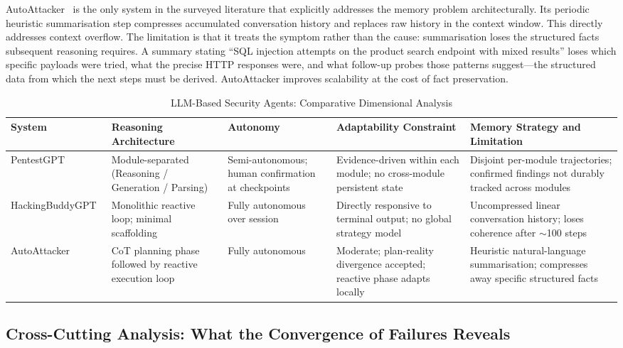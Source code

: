 \documentclass[12pt,a4paper,oneside,openany]{book}
\begin{document}
AutoAttacker~\citep{xu2024autoattacker} is the only system in the surveyed literature that explicitly addresses the memory problem architecturally. Its periodic heuristic summarisation step compresses accumulated conversation history and replaces raw history in the context window. This directly addresses context overflow. The limitation is that it treats the symptom rather than the cause: summarisation loses the structured facts subsequent reasoning requires. A summary stating ``SQL injection attempts on the product search endpoint with mixed results'' loses which specific payloads were tried, what the precise HTTP responses were, and what follow-up probes those patterns suggest---the structured data from which the next steps must be derived. AutoAttacker improves scalability at the cost of fact preservation.


\begin{table}[H]
\centering
\caption{LLM-Based Security Agents: Comparative Dimensional Analysis}
\label{tab:llm_agents}
\begin{tabularx}{\textwidth}{@{}lXXXX@{}}
\toprule
\textbf{System} & \textbf{Reasoning Architecture} & \textbf{Autonomy} & \textbf{Adaptability Constraint} & \textbf{Memory Strategy and Limitation} \\
\midrule
PentestGPT~\citep{deng2024pentestgpt} & Module-separated (Reasoning / Generation / Parsing) & Semi-autonomous; human confirmation at checkpoints & Evidence-driven within each module; no cross-module persistent state & Disjoint per-module trajectories; confirmed findings not durably tracked across modules \\[4pt]
HackingBuddyGPT~\citep{happe2023hackerllm} & Monolithic reactive loop; minimal scaffolding & Fully autonomous over session & Directly responsive to terminal output; no global strategy model & Uncompressed linear conversation history; loses coherence after $\sim$100 steps \\[4pt]
AutoAttacker~\citep{xu2024autoattacker} & CoT planning phase followed by reactive execution loop & Fully autonomous & Moderate; plan-reality divergence accepted; reactive phase adapts locally & Heuristic natural-language summarisation; compresses away specific structured facts \\
\bottomrule
\end{tabularx}
\end{table}

\subsection{Cross-Cutting Analysis: What the Convergence of Failures Reveals}
\end{document}
